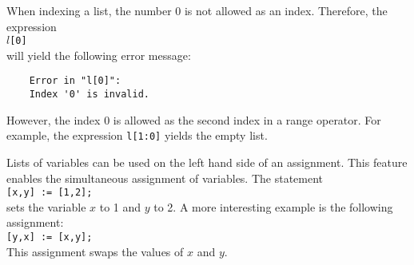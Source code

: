 When indexing a list, the number $0$ is not allowed as an index.  Therefore, the expression
\\[0.2cm]
\hspace*{1.3cm}
\texttt{$l$[0]}
\\[0.2cm]
will yield the following error message:
\begin{verbatim}
    Error in "l[0]":
    Index '0' is invalid.
\end{verbatim}
However, the index $0$ is allowed as the second index in a range operator.  For example, the expression
\texttt{l[1:0]}
yields the empty list.


Lists of variables can be used on the left hand side of an assignment.  This feature enables the
simultaneous assignment of variables.  The statement
\\[0.2cm]
\hspace*{1.3cm}
\texttt{[x,y] := [1,2];}
\\[0.2cm]
sets the variable $x$ to 1 and $y$ to 2.  A more interesting example is the following assignment:
\\[0.2cm]
\hspace*{1.3cm}
\texttt{[y,x] := [x,y];}
\\[0.2cm]
This assignment swaps the values of $x$ and $y$.

